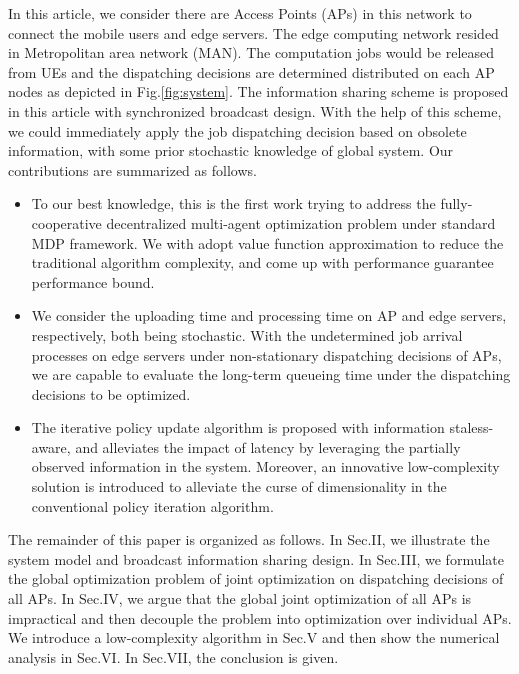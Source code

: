 In this article, we consider there are Access Points (APs) in this network to connect the mobile users and edge servers.
The edge computing network resided in Metropolitan area network (MAN).
The computation jobs would be released from UEs and the dispatching decisions are determined distributed on each AP nodes as depicted in Fig.\ref{fig:system}.
The information sharing scheme is proposed in this article with synchronized broadcast design. With the help of this scheme, we could immediately apply the job dispatching decision based on obsolete information, with some prior stochastic knowledge of global system.
Our contributions are summarized as follows.
\begin{itemize}
    \item To our best knowledge, this is the first work trying to address the fully-cooperative decentralized multi-agent optimization problem under standard MDP framework.
    We with adopt value function approximation to reduce the traditional algorithm complexity, and come up with performance guarantee performance bound.

    \item We consider the uploading time and processing time on AP and edge servers, respectively, both being stochastic.
    With the undetermined job arrival processes on edge servers under non-stationary dispatching decisions of APs, we are capable to evaluate the long-term queueing time under the dispatching decisions to be optimized.

    \item The iterative policy update algorithm is proposed with information staless-aware, and alleviates the impact of latency by leveraging the partially observed information in the system.
    Moreover, an innovative low-complexity solution is introduced to alleviate the curse of dimensionality in the conventional policy iteration algorithm.
\end{itemize}

The remainder of this paper is organized as follows.
In Sec.II, we illustrate the system model and broadcast information sharing design.
In Sec.III, we formulate the global optimization problem of joint optimization on dispatching decisions of all APs.
In Sec.IV, we argue that the global joint optimization of all APs is impractical and then decouple the problem into optimization over individual APs.
We introduce a low-complexity algorithm in Sec.V and then show the numerical analysis in Sec.VI.
In Sec.VII, the conclusion is given.

